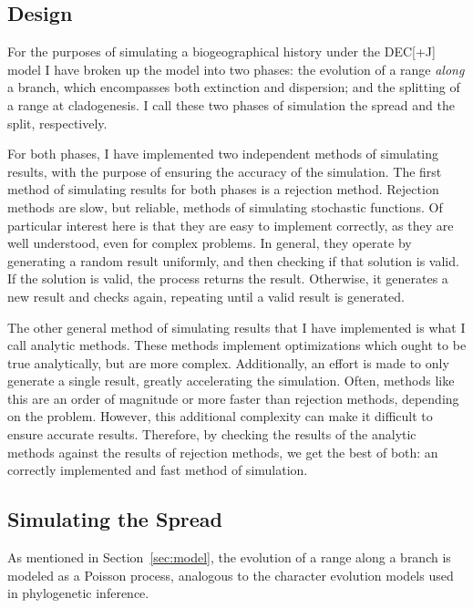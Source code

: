\documentclass{article}
\begin{document}
\subsection{Design}

For the purposes of simulating a biogeographical history under the DEC[+J]
model I have broken up the model into two phases: the evolution of a range
\textit{along} a branch, which encompasses both extinction and dispersion; and
the splitting of a range at cladogenesis.
I call these two phases of simulation the spread and the split, respectively.

For both phases, I have implemented two independent methods of simulating
results, with the purpose of ensuring the accuracy of the simulation.
The first method of simulating results for both phases is a rejection method.
Rejection methods are slow, but reliable, methods of simulating stochastic
functions.
Of particular interest here is that they are easy to implement correctly, as
they are well understood, even for complex problems.
In general, they operate by generating a random result uniformly, and then
checking if that solution is valid.
If the solution is valid, the process returns the result.
Otherwise, it generates a new result and checks again, repeating until a valid
result is generated.

The other general method of simulating results that I have implemented is what
I call analytic methods.
These methods implement optimizations which ought to be true analytically, but
are more complex.
Additionally, an effort is made to only generate a single result, greatly
accelerating the simulation.
Often, methods like this are an order of magnitude or more faster than
rejection methods, depending on the problem.
However, this additional complexity can make it difficult to ensure accurate
results.
Therefore, by checking the results of the analytic methods against the results
of rejection methods, we get the best of both: an correctly implemented and
fast method of simulation.

\subsection{Simulating the Spread}

As mentioned in Section~\ref{sec:model}, the evolution of a range along a
branch is modeled as a Poisson process, analogous to the character evolution
models used in phylogenetic inference.
\end{document}

